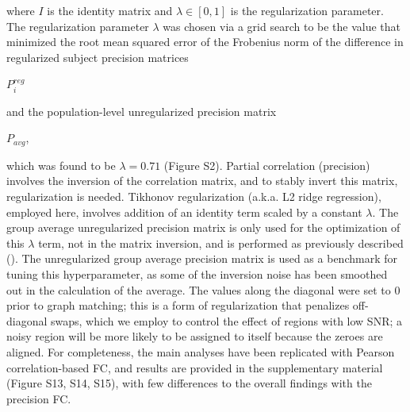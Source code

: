 \documentclass[phd,tocprelim]{cornell}
\begin{document}
    where $I$ is the identity matrix and $\lambda \in [0,1]$ is the regularization parameter. The regularization parameter $\lambda$ was chosen via a grid search to be the value that minimized the root mean squared error of the Frobenius norm of the difference in regularized subject precision matrices \begin{Large}$P_i^{reg}$\end{Large} and the population-level unregularized precision matrix \begin{Large}$P_{avg}$,\end{Large} which was found to be $\lambda = 0.71$ (Figure S2). Partial correlation (precision) involves the inversion of the correlation matrix, and to stably invert this matrix, regularization is needed. Tikhonov regularization (a.k.a. L2 ridge regression), employed here, involves addition of an identity term scaled by a constant $\lambda$. The group average unregularized precision matrix is only used for the optimization of this $\lambda$ term, not in the matrix inversion, and is performed as previously described (\cite{Liegeois2020-ua, Golub1999-ou}). The unregularized group average precision matrix is used as a benchmark for tuning this hyperparameter, as some of the inversion noise has been smoothed out in the calculation of the average. The values along the diagonal were set to 0 prior to graph matching; this is a form of regularization that penalizes off-diagonal swaps, which we employ to control the effect of regions with low SNR; a noisy region will be more likely to be assigned to itself because the zeroes are aligned. For completeness, the main analyses have been replicated with Pearson correlation-based FC, and results are provided in the supplementary material (Figure S13, S14, S15), with few differences to the overall findings with the precision FC.
    
\end{document}
